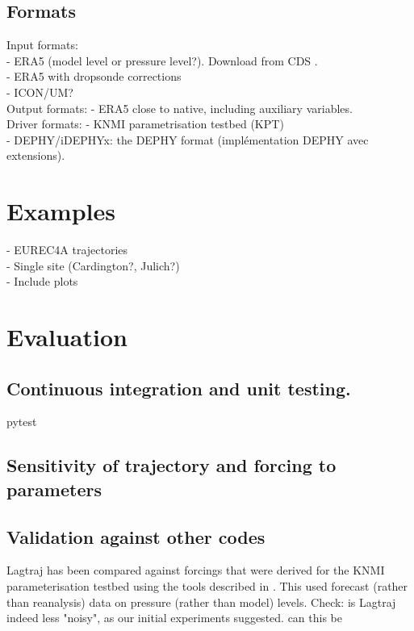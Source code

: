 \documentclass[a4paper,11pt]{article}
\begin{document}
\subsection{Formats}

Input formats: \\
- ERA5 (model level or pressure level?). Download from CDS \citep{raoult2017}. \\
- ERA5 with dropsonde corrections \citep{bony2019} \\
- ICON/UM? \\

Output formats:
- ERA5 close to native, including auxiliary variables. \\

Driver formats:
- KNMI parametrisation testbed (KPT) \\
- DEPHY/iDEPHYx: the DEPHY format (impl\'ementation DEPHY avec extensions). \\

\section{Examples}\label{sec:examples}

- EUREC4A trajectories \cite{bony2017} \\
- Single site (Cardington?, Julich?) \\
- Include plots

\section{Evaluation}\label{sec:evaluation}

\subsection{Continuous integration and unit testing.}

pytest \citep{okken2017}

\subsection{Sensitivity of trajectory and forcing to parameters}



\subsection{Validation against other codes}

Lagtraj has been compared against forcings that were derived for the KNMI parameterisation testbed using the tools described in .
This used forecast (rather than reanalysis) data on pressure (rather than model) levels.
Check: is Lagtraj indeed less "noisy", as our initial experiments suggested. can this be
\end{document}
